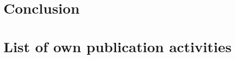 \documentclass[english,phd]{diploma}
\begin{document}
\chapter{Conclusion}
\label{ch:conclusion}


%

\chapter*{List of own publication activities}
\label{ch:listofstudentsownpublicationactivities}



%

\renewcommand*{\bibfont}{\small}
\printbibliography[heading=bibintoc, title={Bibliography}]

\appendix

\end{document}
